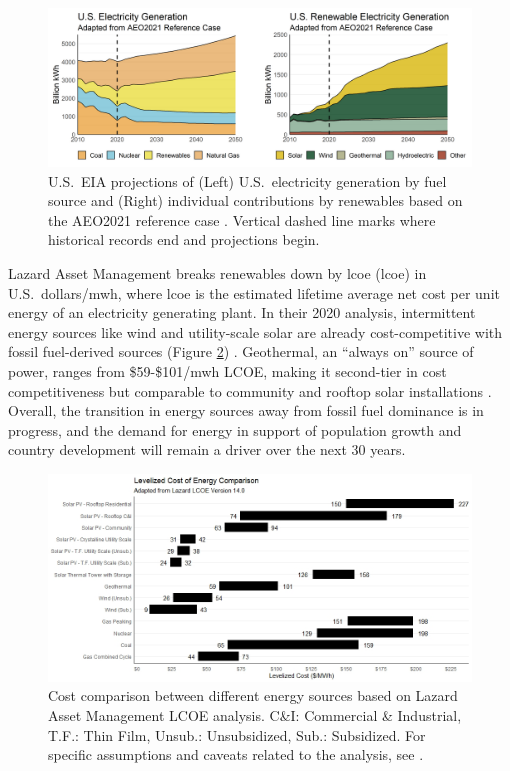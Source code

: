 \begin{figure}[htp]
\centering
\includegraphics[width=\textwidth]{templates/images/Figure-EIA_projections.png}
\caption[U.S.\ EIA projections based on the AEO2021 reference case]{U.S.\ EIA projections of (Left) U.S.\ electricity generation by fuel source and (Right) individual contributions by renewables based on the AEO2021 reference case \protect\citep{eia_annual_2021}. Vertical dashed line marks where historical records end and projections begin.}
\label{fig:eia_2021_projections}
\end{figure}

Lazard Asset Management breaks renewables down by \acrlong{lcoe} (\acrshort{lcoe}) in U.S.\ dollars/\acrshort{mwh}, where \acrshort{lcoe} is the estimated lifetime average net cost per unit energy of an electricity generating plant. In their 2020 analysis, intermittent energy sources like wind and utility-scale solar are already cost-competitive with fossil fuel-derived sources (Figure \ref{fig:lazard_lcoe}) \citep{lazard_lazards_2020}. Geothermal, an “always on” source of power, ranges from \$59-\$101/\acrshort{mwh} LCOE, making it second-tier in cost competitiveness but comparable to community and rooftop solar installations \citep{lazard_lazards_2020}. Overall, the transition in energy sources away from fossil fuel dominance is in progress, and the demand for energy in support of population growth and country development will remain a driver over the next 30 years.
 
\begin{figure}[htp]
\centering
\includegraphics[width=\textwidth]{templates/images/Figure-Lazard_LCOE_recreated.jpeg}
\caption[Lazard Levelized Cost of Energy 2021 projections]{Cost comparison between different energy sources based on Lazard Asset Management LCOE analysis. C\&I: Commercial \& Industrial, T.F.: Thin Film, Unsub.: Unsubsidized, Sub.: Subsidized. For specific assumptions and caveats related to the analysis, see \protect\citet{lazard_lazards_2020}.}
\label{fig:lazard_lcoe}
\end{figure}

